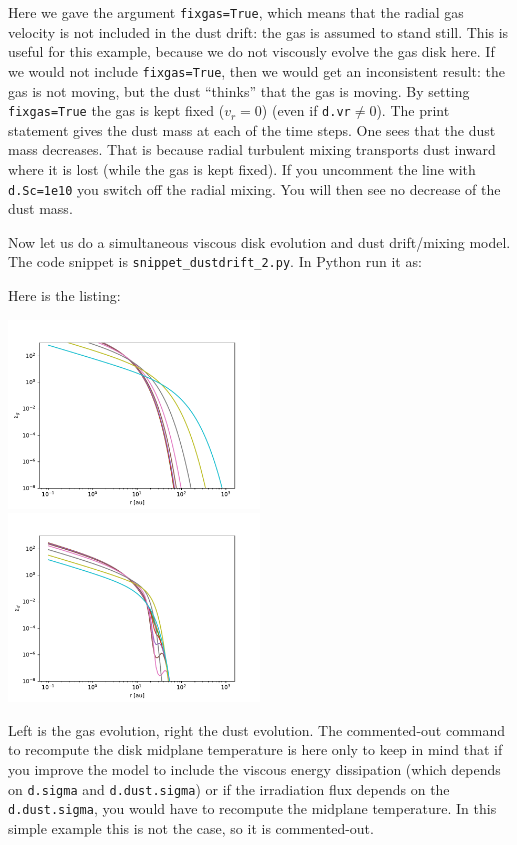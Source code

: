 \documentclass{book}
\newcommand{\code}[1]{{\small\tt #1}}
\begin{document}
Here we gave the argument \code{fixgas=True}, which means that the radial gas
velocity is not included in the dust drift: the gas is assumed to stand
still. This is useful for this example, because we do not viscously evolve the
gas disk here. If we would not include \code{fixgas=True}, then we would get an
inconsistent result: the gas is not moving, but the dust ``thinks'' that the gas
is moving. By setting \code{fixgas=True} the gas is kept fixed ($v_r=0$) (even
if \code{d.vr}$\ne 0$). The print statement gives the dust mass at each of the
time steps. One sees that the dust mass decreases. That is because radial
turbulent mixing transports dust inward where it is lost (while the gas is kept
fixed). If you uncomment the line with \code{d.Sc=1e10} you switch off the
radial mixing. You will then see no decrease of the dust mass.

Now let us do a simultaneous viscous disk evolution and dust drift/mixing
model. The code snippet is
\code{snippet\_dustdrift\_2.py}. In Python run it as:
\begin{codebox}
\end{codebox}
Here is the listing:

\centerline{\includegraphics[width=0.5\textwidth]{../snippets/fig_snippet_dustdrift_2_1.pdf}
\includegraphics[width=0.5\textwidth]{../snippets/fig_snippet_dustdrift_2_2.pdf}}
Left is the gas evolution, right the dust evolution.
The commented-out command to recompute the disk midplane temperature is
here only to keep in mind that if you improve the model to include
the viscous energy dissipation (which depends on \code{d.sigma} and
\code{d.dust.sigma})
or if the irradiation flux depends on the \code{d.dust.sigma}, you would have to
recompute the midplane temperature. In this simple example this is
not the case, so it is commented-out.
\end{document}
